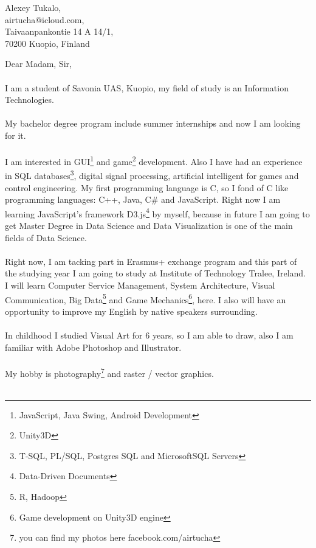 \documentclass[english]{article}
\date{}
\begin{document}
\begin{flushright}
Alexey Tukalo,\\
airtucha@icloud.com,\\
Taivaanpankontie 14 A 14/1,\\
70200 Kuopio, Finland
\end{flushright}

Dear Madam, Sir,\\\\
I am a student of Savonia UAS, Kuopio, my field of study is an Information Technologies.\\\\
My bachelor degree program include summer internships and now I am looking for it. \\\\
I am interested in GUI\footnote{JavaScript, Java Swing, Android Development} and game\footnote{Unity3D} development. Also I have had an experience in SQL databases\footnote{T-SQL, PL/SQL, Postgres SQL and MicrosoftSQL Servers}, digital signal processing, artificial intelligent for games and control engineering. My first programming language is C, so I fond of C like programming languages: C++, Java, C\# and JavaScript. Right now I am learning JavaScript's framework D3.js\footnote{Data-Driven Documents} by myself, because in future I am going to get Master Degree in Data Science and Data Visualization is one of the main fields of Data Science.\\\\
Right now, I am tacking part in Erasmus+ exchange program and this part of the studying year I am going to study at Institute of Technology Tralee, Ireland. I will learn Computer Service Management, System Architecture, Visual Communication, Big Data\footnote{R, Hadoop} and Game Mechanics\footnote{Game development on Unity3D engine}, here. I also will have an opportunity to improve my English by native speakers surrounding. \\\\
In childhood I studied Visual Art for 6 years, so I am able to draw, also I am familiar with Adobe Photoshop and Illustrator.\\\\
My hobby is photography\footnote{you can find my photos here facebook.com/airtucha} and raster / vector graphics. \\\\
\end{document}
